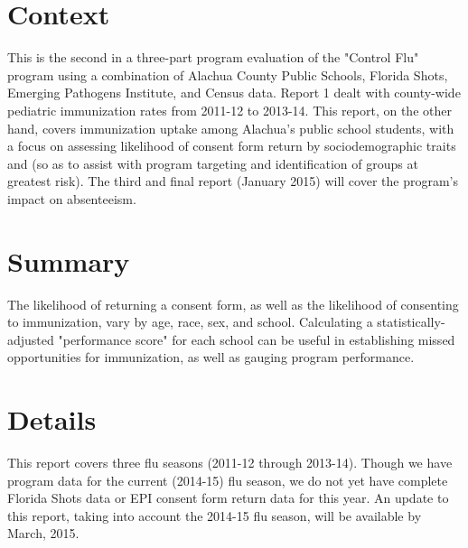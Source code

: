\setlength\columnsep{20pt}
\usepackage{Sweave}
 


\pagestyle{empty} %

\titleGP %




\section*{Context}
This is the second in a three-part program evaluation of the "Control Flu" program using a combination of Alachua County Public Schools, Florida Shots, Emerging Pathogens Institute, and Census data.  Report 1 dealt with county-wide pediatric immunization rates from 2011-12 to 2013-14.  This report, on the other hand, covers immunization uptake among Alachua's public school students, with a focus on assessing likelihood of consent form return by sociodemographic traits and (so as to assist with program targeting and identification of groups at greatest risk).  The third and final report (January 2015) will cover the program's impact on absenteeism.  

\section*{Summary}
The likelihood of returning a consent form, as well as the likelihood of consenting to immunization, vary by age, race, sex, and school.  Calculating a statistically-adjusted "performance score" for each school can be useful in establishing missed opportunities for immunization, as well as gauging program performance.   \\


\section*{Details}
This report covers three flu seasons (2011-12 through 2013-14).  Though we have program data for the current (2014-15) flu season, we do not yet have complete Florida Shots data or EPI consent form return data for this year.  An update to this report, taking into account the 2014-15 flu season, will be available by March, 2015.  

\tableofcontents



